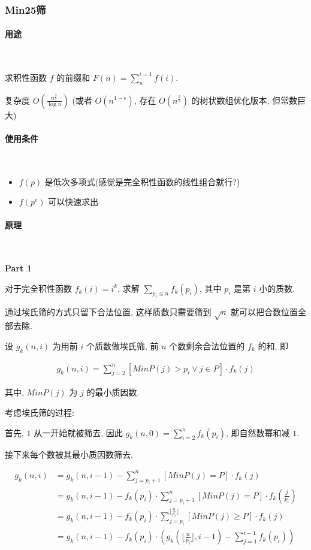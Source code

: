 \documentclass{ctexart}
\begin{document}
\subsubsection{Min25筛}
\paragraph{用途}\ 

求积性函数 $f$ 的前缀和 $F(n)=\sum_n^{i=1} f(i)$.

复杂度 $O(\frac{n^{\frac{3}{4}}}{\log{n}})$ (或者 $O(n^{1-\epsilon})$, 存在 $O(n^{\frac{2}{3}})$ 的树状数组优化版本, 但常数巨大)

\paragraph{使用条件}\ 

\begin{itemize}
    \item $f(p)$ 是低次多项式(感觉是完全积性函数的线性组合就行?)
    \item $f(p^e)$ 可以快速求出
\end{itemize}

\paragraph{原理}\ 

\textbf{Part 1}

对于完全积性函数 $f_k(i)=i^k$, 求解 $\sum_{p_i \le n} f_k(p_i)$, 其中 $p_i$ 是第 $i$ 小的质数.

通过埃氏筛的方式只留下合法位置, 这样质数只需要筛到 $\sqrt{n}$ 就可以把合数位置全部去除.

设 $g_k(n,i)$ 为用前 $i$ 个质数做埃氏筛, 前 $n$ 个数剩余合法位置的 $f_k$ 的和, 即

\begin{align*}
    g_k(n,i)=\sum_{j=2}^{n}{[MinP(j) > p_i \lor j \in P] \cdot f_k(j)}
\end{align*}

其中, $MinP(j)$ 为 $j$ 的最小质因数.

考虑埃氏筛的过程:

首先, $1$ 从一开始就被筛去, 因此 $g_k(n,0) = \sum_{i=2}^{n} f_k(p_i)$, 即自然数幂和减 $1$.

接下来每个数被其最小质因数筛去.

\begin{align*}
    g_k(n,i)&=g_k(n,i-1)-\sum_{j=p_i+1}^{n}{[MinP(j)=P]\cdot f_k(j)}\\
          &=g_k(n,i-1)-f_k(p_i)\cdot\sum_{j=p_i+1}^{n}{[MinP(j)=P]\cdot f_k(\frac{j}{p_i})}\\
          &=g_k(n,i-1)-f_k(p_i)\cdot\sum_{j=p_i}^{\lfloor \frac{n}{p_i} \rfloor}{[MinP(j)\ge P]\cdot f_k(j)}\\
          &=g_k(n,i-1)-f_k(p_i)\cdot(g_k(\lfloor \frac{n}{p_i} \rfloor,i-1)-\sum_{j=1}^{i-1}f_k(p_i))
\end{align*}
\end{document}
